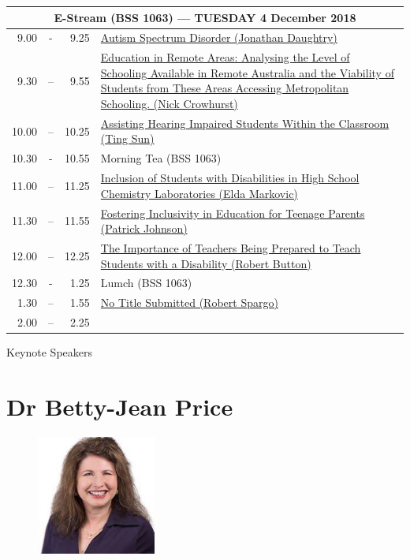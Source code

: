 \documentclass[twoside,12pt,a4paper,notitlepage]{memoir}
\begin{document}
\begin{center}
\begin{tabular}{rcr|p{10.8cm}}
 \multicolumn{4}{c}{{\large E-Stream (BSS 1063) --- TUESDAY 4 December 2018}} \\ \hline
9.00 & - & 9.25 &
 \hyperref[aut:daughtry]{Autism Spectrum Disorder (Jonathan Daughtry)} \\ \hline
9.30 & – & 9.55 &
 \hyperref[aut:crowhurst]{Education in Remote Areas: Analysing the Level of Schooling Available in Remote Australia and the Viability of Students from These Areas Accessing Metropolitan Schooling. (Nick Crowhurst)} \\ \hline
10.00 & – & 10.25 &
\hyperref[aut:sun]{Assisting Hearing Impaired Students Within the Classroom (Ting Sun)} \\ \hline
10.30 & - & 10.55 & Morning Tea (BSS 1063) \\ \hline
11.00 & – & 11.25 & 
 \hyperref[aut:markovic]{Inclusion of Students with Disabilities in High School Chemistry Laboratories (Elda Markovic)} \\ \hline
11.30 & – & 11.55 &
 \hyperref[aut:johnson]{Fostering Inclusivity in Education for Teenage Parents (Patrick Johnson)} \\ \hline
12.00 & – & 12.25 &
 \hyperref[aut:button]{The Importance of Teachers Being Prepared to Teach Students with a Disability
 (Robert Button)} \\ \hline
12.30 & - & 1.25 & Lumch (BSS 1063) \\ \hline
1.30 & – & 1.55 &
 \hyperref[aut:spargo]{No Title Submitted (Robert Spargo)} \\ \hline
2.00 & – & 2.25 & \\ \hline
\end{tabular}
\end{center}


% 



\clearpage{}
\vspace*{2cm}
{\Huge Keynote Speakers}
\vspace{2cm}

\section*{Dr Betty-Jean Price}

\begin{figure}
\centering
\includegraphics[width=0.35\textwidth]{betty_jean.jpg}
\end{figure}
\end{document}
